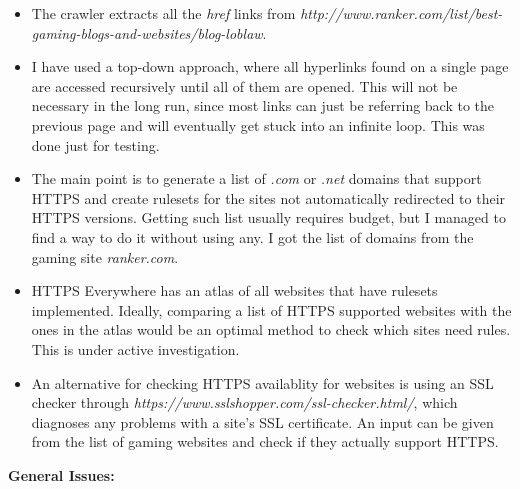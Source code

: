 \documentclass[a4paper, 12pt, titlepage]{article}
\begin{document}
\begin{itemize}
\item{The crawler extracts all the \textit{href} links from \textit{http://www.ranker.com/list/best-gaming-blogs-and-websites/blog-loblaw}.}
\item{I have used a top-down approach, where all hyperlinks found on a single page are accessed recursively until all of them are opened. This will not be necessary in the long run, since most links can just be referring back to the previous page and will eventually get stuck into an infinite loop. This was done just for testing.}
\item{The main point is to generate a list of \textit{.com} or \textit{.net} domains that support HTTPS and create rulesets for the sites not automatically redirected to their HTTPS versions. Getting such list usually requires budget, but I managed to find a way to do it without using any. I got the list of domains from the gaming site \textit{ranker.com}.}
\item{HTTPS Everywhere has an atlas of all websites that have rulesets implemented. Ideally, comparing a list of HTTPS supported websites with the ones in the atlas would be an optimal method to check which sites need rules. This is under active investigation.}
\item{An alternative for checking HTTPS availablity for websites is using an SSL checker through \textit{https://www.sslshopper.com/ssl-checker.html/}, which diagnoses any problems with a site's SSL certificate. An input can be given from the list of gaming websites and check if they actually support HTTPS.}
\end{itemize}
\textbf{General Issues:}
\end{document}
